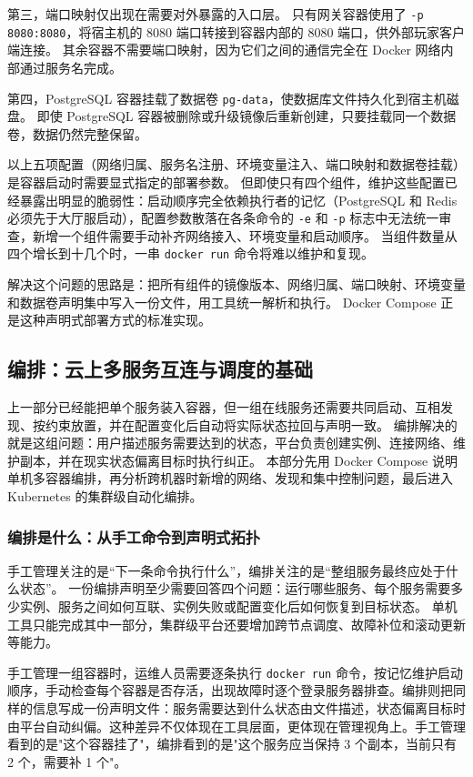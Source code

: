 第三，端口映射仅出现在需要对外暴露的入口层。
只有网关容器使用了 \texttt{-p 8080:8080}，将宿主机的 8080 端口转接到容器内部的 8080 端口，供外部玩家客户端连接。
其余容器不需要端口映射，因为它们之间的通信完全在 Docker 网络内部通过服务名完成。

第四，PostgreSQL 容器挂载了数据卷 \texttt{pg-data}，使数据库文件持久化到宿主机磁盘。
即使 PostgreSQL 容器被删除或升级镜像后重新创建，只要挂载同一个数据卷，数据仍然完整保留。

以上五项配置（网络归属、服务名注册、环境变量注入、端口映射和数据卷挂载）是容器启动时需要显式指定的部署参数。
但即使只有四个组件，维护这些配置已经暴露出明显的脆弱性：启动顺序完全依赖执行者的记忆（PostgreSQL 和 Redis 必须先于大厅服启动），配置参数散落在各条命令的 \texttt{-e} 和 \texttt{-p} 标志中无法统一审查，新增一个组件需要手动补齐网络接入、环境变量和启动顺序。
当组件数量从四个增长到十几个时，一串 \texttt{docker run} 命令将难以维护和复现。

解决这个问题的思路是：把所有组件的镜像版本、网络归属、端口映射、环境变量和数据卷声明集中写入一份文件，用工具统一解析和执行。
Docker Compose 正是这种声明式部署方式的标准实现。

\subsection{编排：云上多服务互连与调度的基础}\label{sec5:orchestration}

上一部分已经能把单个服务装入容器，但一组在线服务还需要共同启动、互相发现、按约束放置，并在配置变化后自动将实际状态拉回与声明一致。
编排解决的就是这组问题：用户描述服务需要达到的状态，平台负责创建实例、连接网络、维护副本，并在现实状态偏离目标时执行纠正。
本部分先用 Docker Compose 说明单机多容器编排，再分析跨机器时新增的网络、发现和集中控制问题，最后进入 Kubernetes 的集群级自动化编排。

\subsubsection{编排是什么：从手工命令到声明式拓扑}

手工管理关注的是“下一条命令执行什么”，编排关注的是“整组服务最终应处于什么状态”。
一份编排声明至少需要回答四个问题：运行哪些服务、每个服务需要多少实例、服务之间如何互联、实例失败或配置变化后如何恢复到目标状态。
单机工具只能完成其中一部分，集群级平台还要增加跨节点调度、故障补位和滚动更新等能力。

手工管理一组容器时，运维人员需要逐条执行 \texttt{docker run} 命令，按记忆维护启动顺序，手动检查每个容器是否存活，出现故障时逐个登录服务器排查。编排则把同样的信息写成一份声明文件：服务需要达到什么状态由文件描述，状态偏离目标时由平台自动纠偏。这种差异不仅体现在工具层面，更体现在管理视角上。手工管理看到的是"这个容器挂了"，编排看到的是"这个服务应当保持 3 个副本，当前只有 2 个，需要补 1 个"。

